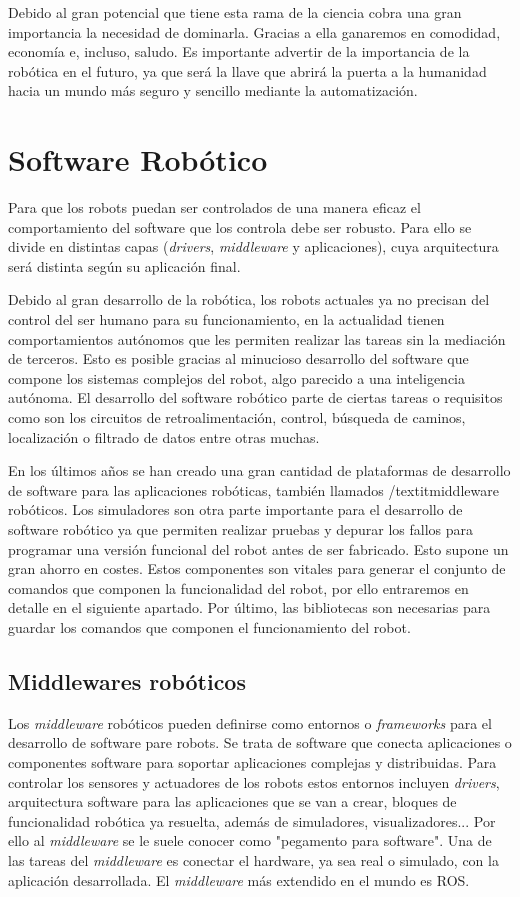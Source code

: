 Debido al gran potencial que tiene esta rama de la ciencia cobra una gran importancia la necesidad de dominarla. Gracias a ella ganaremos en comodidad, economía e, incluso, saludo. Es importante advertir de la importancia de la robótica en el futuro, ya que será la llave que abrirá la puerta a la humanidad hacia un mundo más seguro y sencillo mediante la automatización.

\section{Software Robótico}
Para que los robots puedan ser controlados de una manera eficaz el comportamiento del software que los controla debe ser robusto. Para ello se divide en distintas capas (\textit{drivers}, \textit{middleware} y aplicaciones), cuya arquitectura será distinta según su aplicación final.

Debido al gran desarrollo de la robótica, los robots actuales ya no precisan del control del ser humano para su funcionamiento, en la actualidad tienen comportamientos autónomos que les permiten realizar las tareas sin la mediación de terceros. Esto es posible gracias al minucioso desarrollo del software que compone los sistemas complejos del robot, algo parecido a una inteligencia autónoma. El desarrollo del software robótico parte de ciertas tareas o requisitos como son los circuitos de retroalimentación, control, búsqueda de caminos, localización o filtrado de datos entre otras muchas.

En los últimos años se han creado una gran cantidad de plataformas de desarrollo de software para las aplicaciones robóticas, también llamados /textit{middleware} robóticos. Los simuladores son otra parte importante para el desarrollo de software robótico ya que permiten realizar pruebas y depurar los fallos para programar una versión funcional del robot antes de ser fabricado. Esto supone un gran ahorro en costes. Estos componentes son vitales para generar el conjunto de comandos que componen la funcionalidad del robot, por ello entraremos en detalle en el siguiente apartado. Por último, las bibliotecas son necesarias para guardar los comandos que componen el funcionamiento del robot.

\subsection{Middlewares robóticos}
Los \textit{middleware} robóticos pueden definirse como entornos o \textit{frameworks} para el desarrollo de software pare robots. Se trata de software que conecta aplicaciones o componentes software para soportar aplicaciones complejas y distribuidas. Para controlar los sensores y actuadores de los robots estos entornos incluyen \textit{drivers}, arquitectura software para las aplicaciones que se van a crear, bloques de funcionalidad robótica ya resuelta, además de simuladores, visualizadores... Por ello al \textit{middleware} se le suele conocer como "pegamento para software". Una de las tareas del \textit{middleware} es conectar el hardware, ya sea real o simulado, con la aplicación desarrollada. El \textit{middleware} más extendido en el mundo es ROS.

